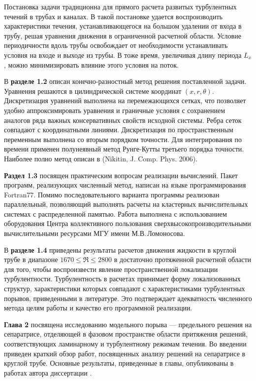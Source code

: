 Постановка задачи традиционна для прямого расчета развитых турбулентных течений в трубах и каналах. В такой постановке удается воспроизводить характеристики течения, устанавливающегося на большом удалении от входа в трубу, решая уравнения движения в ограниченной расчетной области. Условие периодичности вдоль трубы освобождает от необходимости устанавливать условия на входе и выходе из трубы. В тоже время, увеличивая длину периода $L_x$, можно минимизировать влияние этого условия на поток.

В \textbf{разделе 1.2} описан конечно-разностный метод решения поставленной задачи. Уравнения решаются в цилиндрической системе координат $(x,r,\theta)$. Дискретизация уравнений выполнена на перемежающихся сетках, что позволяет удобно аппроксимировать уравнения и граничные условия с сохранением аналогов ряда важных консервативных свойств исходной системы. Ребра сеток совпадают с координатными линиями. Дискретизация по пространственным переменным выполнена со вторым порядком точности. Для интегрирования по времени применен полунеявный метод Рунге-Кутты третьего порядка точности. Наиболее полно метод описан в (Nikitin, J. Comp. Phys. 2006).

\textbf{Раздел 1.3} посвящен практическим вопросам реализации вычислений. Пакет программ, реализующих численный метод, написан на языке программирования Fortran77. Помимо последовательного варианта программы реализован параллельный, позволяющий выполнять расчеты на кластерных вычислительных системах с распределенной памятью. Работа выполнена с использованием оборудования Центра коллективного пользования сверхвысокопроизводительными вычислительными ресурсами МГУ имени М.В.\,Ломоносова. 

В \textbf{разделе 1.4} приведены результаты расчетов движения жидкости в круглой трубе в диапазоне $1670 \leqslant \Re \leqslant 2800$ в достаточно протяженной расчетной области для того, чтобы воспроизвести явление пространственной локализации турбулентности. Турбулентность в расчетах принимает форму локализованных структур, характеристики которых совпадают с характеристиками турбулентных порывов, приведенными в литературе. Это подтверждает адекватность численного метода целям работы и качество его программной реализации. 

\textbf{Глава 2} посвящена исследованию модельного порыва --- предельного решения на сепаратрисе, отделяющей в фазовом пространстве области притяжения решений, соответствующих ламинарному и турбулентному режимам течения. Во введении приведен краткий обзор работ, посвященных анализу решений на сепаратрисе в круглой трубе. Основные результаты, приведенные в главы, опубликованы в работах автора диссертации \cite{MZG2015, Kazan2015, KMU2015}.

